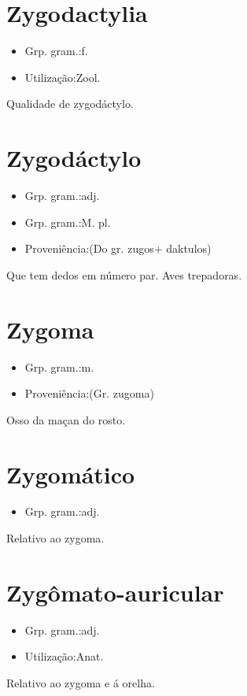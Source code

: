 \section{Zygodactylia}
\begin{itemize}
\item {Grp. gram.:f.}
\end{itemize}
\begin{itemize}
\item {Utilização:Zool.}
\end{itemize}
Qualidade de zygodáctylo.
\section{Zygodáctylo}
\begin{itemize}
\item {Grp. gram.:adj.}
\end{itemize}
\begin{itemize}
\item {Grp. gram.:M. pl.}
\end{itemize}
\begin{itemize}
\item {Proveniência:(Do gr. \textunderscore zugos\textunderscore  + \textunderscore daktulos\textunderscore )}
\end{itemize}
Que tem dedos em número par.
Aves trepadoras.
\section{Zygoma}
\begin{itemize}
\item {Grp. gram.:m.}
\end{itemize}
\begin{itemize}
\item {Proveniência:(Gr. \textunderscore zugoma\textunderscore )}
\end{itemize}
Osso da maçan do rosto.
\section{Zygomático}
\begin{itemize}
\item {Grp. gram.:adj.}
\end{itemize}
Relativo ao zygoma.
\section{Zygômato-auricular}
\begin{itemize}
\item {Grp. gram.:adj.}
\end{itemize}
\begin{itemize}
\item {Utilização:Anat.}
\end{itemize}
Relativo ao zygoma e á orelha.
